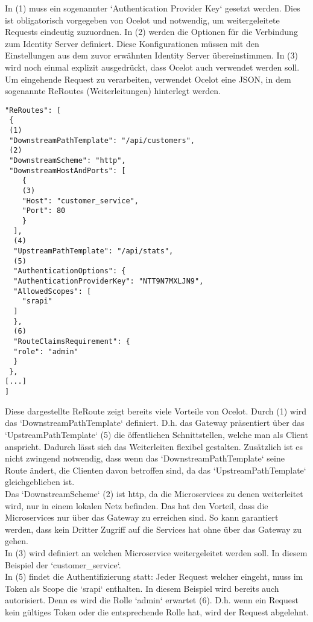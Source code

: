 In (1) muss ein sogenannter `Authentication Provider Key` gesetzt werden. Dies ist obligatorisch vorgegeben von Ocelot und notwendig, um weitergeleitete Requests eindeutig zuzuordnen. In (2) werden die Optionen für die Verbindung zum Identity Server definiert. Diese Konfigurationen müssen mit den Einstellungen aus dem zuvor erwähnten Identity Server übereinstimmen. In (3) wird noch einmal explizit ausgedrückt, dass Ocelot auch verwendet werden soll. \\

Um eingehende Request zu verarbeiten, verwendet Ocelot eine JSON, in dem sogenannte ReRoutes (Weiterleitungen) hinterlegt werden. 

\begin{verbatim}
"ReRoutes": [
 {
 (1)
 "DownstreamPathTemplate": "/api/customers",
 (2)
 "DownstreamScheme": "http",
 "DownstreamHostAndPorts": [
    {
    (3)
    "Host": "customer_service",
    "Port": 80
    }
  ],
  (4)
  "UpstreamPathTemplate": "/api/stats",
  (5)
  "AuthenticationOptions": {
  "AuthenticationProviderKey": "NTT9N7MXLJN9",
  "AllowedScopes": [
    "srapi"
  ]
  },
  (6)
  "RouteClaimsRequirement": {
  "role": "admin"
  }
 },
[...]
]
\end{verbatim}

Diese dargestellte ReRoute zeigt bereits viele Vorteile von Ocelot. Durch (1) wird das `DownstreamPathTemplate` definiert. D.h. das Gateway präsentiert über das `UpstreamPathTemplate` (5) die öffentlichen Schnittstellen, welche man als Client anspricht. Dadurch lässt sich das Weiterleiten flexibel gestalten. Zusätzlich ist es nicht zwingend notwendig, dass wenn das `DownstreamPathTemplate` seine Route ändert, die Clienten davon betroffen sind, da das `UpstreamPathTemplate` gleichgeblieben ist. \\

Das `DownstreamScheme` (2) ist http, da die Microservices zu denen weiterleitet wird, nur in einem lokalen Netz befinden. Das hat den Vorteil, dass die Microservices nur über das Gateway zu erreichen sind. So kann garantiert werden, dass kein Dritter Zugriff auf die Services hat ohne über das Gateway zu gehen. \\

In (3) wird definiert an welchen Microservice weitergeleitet werden soll. In diesem Beispiel der `customer\_service`.\\

In (5) findet die Authentifizierung statt: Jeder Request welcher eingeht, muss im Token als Scope die `srapi` enthalten. In diesem Beispiel wird bereits auch autorisiert. Denn es wird die Rolle `admin` erwartet (6). D.h. wenn ein Request kein gültiges Token oder die entsprechende Rolle hat, wird der Request abgelehnt. \\

